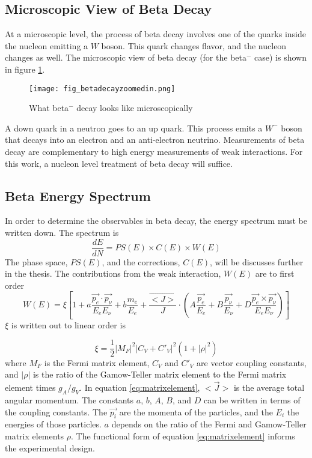 \documentclass[../MaxHughesThesis.tex]{subfiles}
\begin{document}
\subsection{Microscopic View of Beta Decay}
At a microscopic level, the process of beta decay involves one of the quarks inside the nucleon emitting a $W$ boson. 
This quark changes flavor, and the nucleon changes as well. 
The microscopic view of beta decay (for the beta$^{-}$ case) is shown in figure \ref{fig:betadecaymicro}.

\begin{figure}[!htb]
	\centerline{\texttt{[image: fig\_betadecayzoomedin.png]}}
	\caption{What beta$^{-}$ decay looks like microscopically}
	\label{fig:betadecaymicro}
\end{figure}
A down quark in a neutron goes to an up quark.
This process emits a $W^{-}$ boson that decays into an electron and an anti-electron neutrino.
Measurements of beta decay are complementary to high energy measurements of weak interactions.
For this work, a nucleon level treatment of beta decay will suffice.  

\subsection{Beta Energy Spectrum}
In order to determine the observables in beta decay, the energy spectrum must be written down. 
The spectrum is %
\begin{equation}
	\frac{dE}{dN} = PS(E) \times C(E) \times W(E)  
	\label{eq:betaenspectrum}
\end{equation}
The phase space, $PS(E)$, and the corrections, $C(E)$, will be discusses further in the thesis. 
The contributions from the weak interaction, $W(E)$ are to first order \cite{Jack57} %
\begin{equation}
	 W(E) = \xi [1 + a \frac{\vec{p_{e}} \cdot \vec{p_{\nu}}} {E_{e} E_{\nu}}  +  b \frac{m_{e}}{E_{e}} + \frac{\vec{<J>}}{J} \cdot (A \frac{ \vec{p_{e}} }{E_{e}} + B \frac{\vec{p_{\nu}}}{E_{\nu}} + D \frac{\vec{p_{e}} \times \vec{p_{\nu}}}{E_{e} E_{\nu}})]
	\label{eq:matrixelement}
\end{equation}
$\xi$ is written out to linear order is %
 
\begin{equation}
	\xi = \frac{1}{2} |M_{F}|^{2} |C_{V} + C'_{V}|^{2} (1 + |\rho|^{2})
	\label{eq:xiwrittenout}
\end{equation}
where $M_{F}$ is the Fermi matrix element, $C_{V}$ and $C'_{V}$ are vector coupling constants, and $|\rho|$ is the ratio of the Gamow-Teller matrix element to the Fermi matrix element times $g_{A}/g_{V}$.
In equation \ref{eq:matrixelement}, $<\vec{J}>$ is the average total angular momentum. 
The constants $a$, $b$, $A$, $B$, and $D$ can be written in terms of the coupling constants.
The $\vec{p_{i}}$ are the momenta of the particles, and the $E_{i}$ the energies of those particles.
$a$ depends on the ratio of the Fermi and Gamow-Teller matrix elements $\rho$.
The functional form of equation \ref{eq:matrixelement} informs the experimental design.
\end{document}
